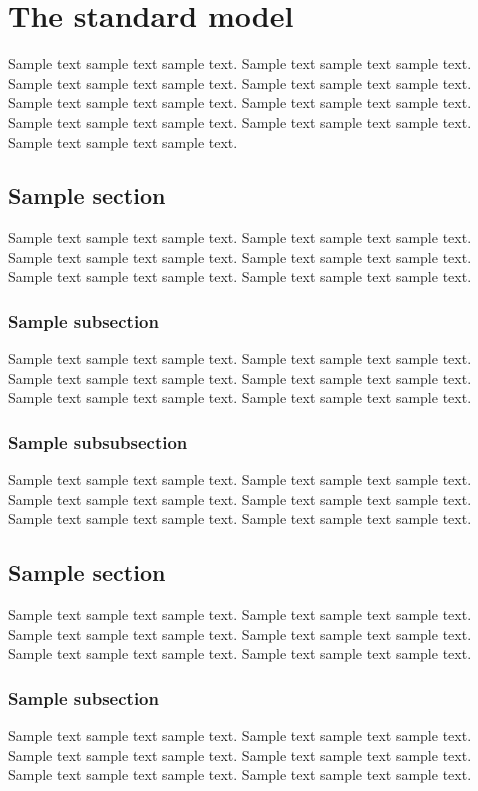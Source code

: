 \chapter{The standard model}

Sample text sample text sample text. Sample text sample text sample text.
Sample text sample text sample text. Sample text sample text sample text.
Sample text sample text sample text. Sample text sample text sample text.
Sample text sample text sample text. Sample text sample text sample text.
Sample text sample text sample text. \cite{Grosz_and_Sidner_1986}

\section{Sample section}
Sample text sample text sample text. Sample text sample text sample text.
Sample text sample text sample text. Sample text sample text sample text.
Sample text sample text sample text. Sample text sample text sample text.

\subsection{Sample subsection}
Sample text sample text sample text. Sample text sample text sample text.
Sample text sample text sample text. Sample text sample text sample text.
Sample text sample text sample text. Sample text sample text sample text.

\subsection{Sample subsubsection}
Sample text sample text sample text. Sample text sample text sample text.
Sample text sample text sample text. Sample text sample text sample text.
Sample text sample text sample text. Sample text sample text sample text.

\section{Sample section}
Sample text sample text sample text. Sample text sample text sample text.
Sample text sample text sample text. Sample text sample text sample text.
Sample text sample text sample text. Sample text sample text sample text.

\subsection{Sample subsection}
Sample text sample text sample text. Sample text sample text sample text.
Sample text sample text sample text. Sample text sample text sample text.
Sample text sample text sample text. Sample text sample text sample text.
